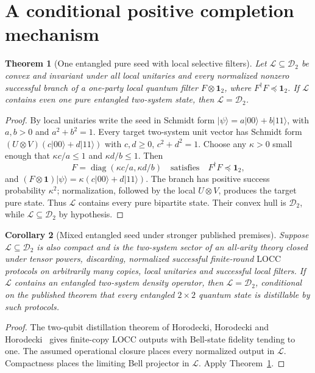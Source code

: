 \documentclass[10pt,letterpaper]{article}
\newtheorem{theorem}{Theorem}
\newtheorem{corollary}[theorem]{Corollary}
\newcommand{\DD}{\mathcal D}
\newcommand{\id}{\mathbf 1}
\newcommand{\LOCC}{\mathrm{LOCC}}
\begin{document}
\section{A conditional positive completion mechanism}
\begin{theorem}[One entangled pure seed with local selective filters]
\label{thm:pure}
Let $\mathcal L\subseteq\DD_2$ be convex and invariant under all local
unitaries and every normalized nonzero successful branch of a one-party
local quantum filter $F\otimes\id_2$, where $F^\dagger F\preceq\id_2$.
If $\mathcal L$ contains even one \emph{pure entangled} two-system state,
then $\mathcal L=\DD_2$.
\end{theorem}
\begin{proof}
By local unitaries write the seed in Schmidt form
$|\psi\rangle=a|00\rangle+b|11\rangle$, with $a,b>0$ and
$a^2+b^2=1$. Every target two-system unit vector has Schmidt form
$(U\otimes V)(c|00\rangle+d|11\rangle)$ with $c,d\ge0$,
$c^2+d^2=1$. Choose any $\kappa>0$ small enough that
$\kappa c/a\le1$ and $\kappa d/b\le1$. Then
\[
F=\operatorname{diag}(\kappa c/a,\kappa d/b)
\quad\text{satisfies}\quad F^\dagger F\preceq\id_2,
\]
and $(F\otimes\id)|\psi\rangle=\kappa(c|00\rangle+d|11\rangle)$.
The branch has positive success probability $\kappa^2$; normalization,
followed by the local $U\otimes V$, produces the target pure state.
Thus $\mathcal L$ contains every pure bipartite state. Their convex hull
is $\DD_2$, while $\mathcal L\subseteq\DD_2$ by hypothesis.
\end{proof}
\begin{corollary}[Mixed entangled seed under stronger published premises]
\label{cor:mixed}
Suppose $\mathcal L\subseteq\DD_2$ is also compact and is the two-system
sector of an all-arity theory closed under tensor powers, discarding,
normalized successful finite-round $\LOCC$ protocols on arbitrarily many
copies, local unitaries and successful local filters. If $\mathcal L$
contains an entangled two-system density operator, then
$\mathcal L=\DD_2$, \emph{conditional on the published theorem} that
every entangled $2\times2$ quantum state is distillable by such protocols.
\end{corollary}
\begin{proof}
The two-qubit distillation theorem of Horodecki, Horodecki and
Horodecki~\cite{Horodecki1997} gives finite-copy $\LOCC$ outputs with
Bell-state fidelity tending to one. The assumed operational closure
places every normalized output in $\mathcal L$. Compactness places
the limiting Bell projector in $\mathcal L$. Apply
Theorem~\ref{thm:pure}.\end{proof}
\end{document}
